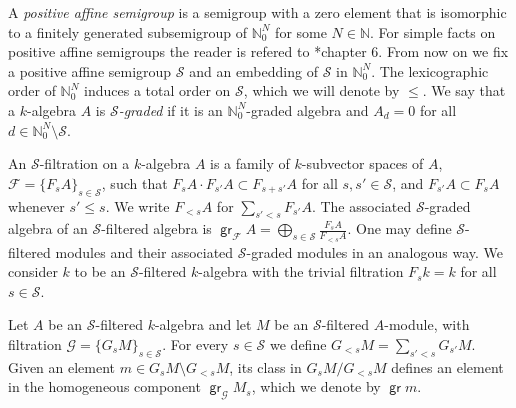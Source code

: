 \documentclass[11pt,fleqn]{article}
\theoremstyle{plain}
\theoremstyle{remark}
\theoremstyle{definition}
\newcommand\NN{\mathbb N}
\renewcommand\S{\mathcal S}
\newcommand\F{\mathcal F}
\newcommand\G{\mathcal G}
\DeclareMathOperator\gr{\mathsf{gr}}
\begin{document}
A \emph{positive affine semigroup} is a semigroup with a zero element that is isomorphic
to a finitely generated subsemigroup of $\NN_0^N$ for some $N \in \NN$. For simple facts
on positive affine semigroups the reader is refered to \cite{BH}*{chapter 6}. From now on 
we fix a positive affine semigroup $\S$ and an embedding of $\S$ in $\NN_0^N$. The
lexicographic order of $\NN_0^N$ induces a total order on $\S$, which we will denote by
$\leq$.  We say that a $k$-algebra $A$ is \emph{$\S$-graded} if it is an
$\NN_0^N$-graded algebra and $A_d = 0$ for all $d \in \NN_0^N \setminus \S$. 

An $\S$-filtration on a $k$-algebra $A$ is a family of $k$-subvector spaces of
$A$, $\F = \{F_sA\}_{s \in \S}$, such that $F_s A \cdot F_{s'}A \subset F_{s+s'} A$ for 
all $s,s' \in \S$, and $F_{s'} A \subset F_sA$ whenever $s' \leq s$. We write $F_{<s} A$
for  $\sum_{s'<s} F_{s'} A$. The associated $\S$-graded algebra of an $\S$-filtered
algebra is $\gr_\F A = \bigoplus_{s \in \S} \frac{F_sA}{F_{<s}A}$. One may define
$\S$-filtered modules and their associated $\S$-graded modules in an analogous way. We
consider $k$ to be an $\S$-filtered $k$-algebra with the trivial filtration $F_sk = k$ for
all $s \in \S$. 

Let $A$ be an $\S$-filtered $k$-algebra and let $M$ be an $\S$-filtered $A$-module, with
filtration $\G = \{G_sM\}_{s \in \S}$. For every $s \in \S$ we define $G_{<s}M = \sum_{s'
< s} G_{s'}M$. Given an element $m \in G_sM \setminus G_{<s}M$, its class in $G_sM /
G_{<s}M$ defines an element in the homogeneous component $\gr_\G M_s$, which we denote by
$\gr m$.
\end{document}

